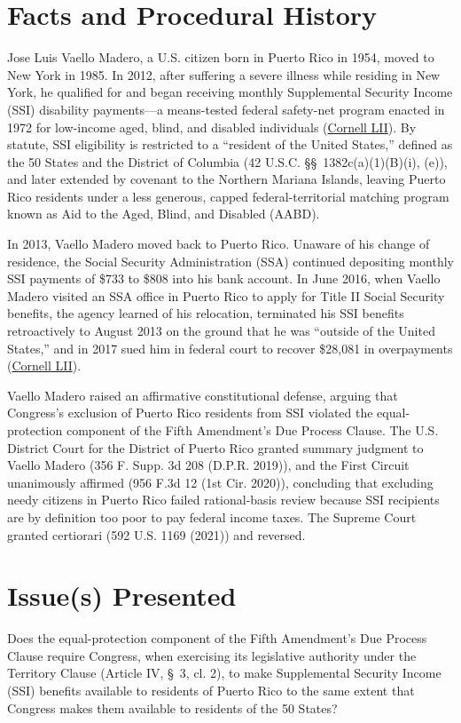 \documentclass[12pt]{article}
\begin{document}
\section{Facts and Procedural History}
Jose Luis Vaello Madero, a U.S. citizen born in Puerto Rico in 1954, moved to New York in 1985. In 2012, after suffering a severe illness while residing in New York, he qualified for and began receiving monthly Supplemental Security Income (SSI) disability payments---a means-tested federal safety-net program enacted in 1972 for low-income aged, blind, and disabled individuals (\href{https://www.law.cornell.edu/supremecourt/text/20-303}{Cornell LII}). By statute, SSI eligibility is restricted to a ``resident of the United States,'' defined as the 50 States and the District of Columbia (42 U.S.C. \S\S~1382c(a)(1)(B)(i), (e)), and later extended by covenant to the Northern Mariana Islands, leaving Puerto Rico residents under a less generous, capped federal-territorial matching program known as Aid to the Aged, Blind, and Disabled (AABD).

In 2013, Vaello Madero moved back to Puerto Rico. Unaware of his change of residence, the Social Security Administration (SSA) continued depositing monthly SSI payments of \$733 to \$808 into his bank account. In June 2016, when Vaello Madero visited an SSA office in Puerto Rico to apply for Title II Social Security benefits, the agency learned of his relocation, terminated his SSI benefits retroactively to August 2013 on the ground that he was ``outside of the United States,'' and in 2017 sued him in federal court to recover \$28,081 in overpayments (\href{https://www.law.cornell.edu/supremecourt/text/20-303}{Cornell LII}).

Vaello Madero raised an affirmative constitutional defense, arguing that Congress's exclusion of Puerto Rico residents from SSI violated the equal-protection component of the Fifth Amendment's Due Process Clause. The U.S. District Court for the District of Puerto Rico granted summary judgment to Vaello Madero (356 F. Supp. 3d 208 (D.P.R. 2019)), and the First Circuit unanimously affirmed (956 F.3d 12 (1st Cir. 2020)), concluding that excluding needy citizens in Puerto Rico failed rational-basis review because SSI recipients are by definition too poor to pay federal income taxes. The Supreme Court granted certiorari (592 U.S. 1169 (2021)) and reversed.

\section{Issue(s) Presented}
Does the equal-protection component of the Fifth Amendment's Due Process Clause require Congress, when exercising its legislative authority under the Territory Clause (Article IV, \S~3, cl. 2), to make Supplemental Security Income (SSI) benefits available to residents of Puerto Rico to the same extent that Congress makes them available to residents of the 50 States?
\end{document}

